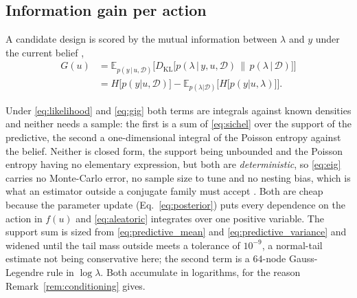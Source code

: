 \documentclass[twoside]{article}
\newcommand\given[1][]{\,#1\vert\,}
\theoremstyle{plain}
\theoremstyle{definition}
\theoremstyle{remark}
\newtheorem{remark}{Remark}
\begin{document}

\subsection{Information gain per action}
\label{sec:inference_acquisition}

A candidate design is scored by the mutual information between $\lambda$ and $y$ under the current belief \citep{lindley1956measure,houlsby2011bald},
%
\begin{align}
        G(u) &= \mathbb{E}_{p(y \given u, \mathcal{D})} \Big[ D_{\text{KL}}\big[ p(\lambda \given y, u, \mathcal{D}) \,\|\, p(\lambda \given \mathcal{D}) \big] \Big]  \label{eq:eig} \\
        &= H\big[ p(y | u, \mathcal{D}) \big] - \mathbb{E}_{p(\lambda | \mathcal{D})} \Big[ H\big[ p(y | u, \lambda) \big] \Big] .
    \label{eq:aleatoric} 
\end{align}
%

Under \eqref{eq:likelihood} and \eqref{eq:gig} both terms are integrals against known densities and neither needs a sample: the first is a sum of \eqref{eq:sichel} over the support of the predictive, the second a one-dimensional integral of the Poisson entropy against the belief.
Neither is closed form, the support being unbounded and the Poisson entropy having no elementary expression, but both are \emph{deterministic}, so \eqref{eq:eig} carries no Monte-Carlo error, no sample size to tune and no nesting bias, which is what an estimator outside a conjugate family must accept \citep{rainforth2018nesting,rainforth2024modern}.
Both are cheap because the parameter update (Eq.~\ref{eq:posterior}) puts every dependence on the action in $f(u)$ and \eqref{eq:aleatoric} integrates over one positive variable.
The support sum is sized from \eqref{eq:predictive_mean} and \eqref{eq:predictive_variance} and widened until the tail mass outside meets a tolerance of $10^{-9}$, a normal-tail estimate not being conservative here; the second term is a $64$-node Gauss-Legendre rule in $\log \lambda$.
Both accumulate in logarithms, for the reason Remark~\ref{rem:conditioning} gives.
\end{document}
